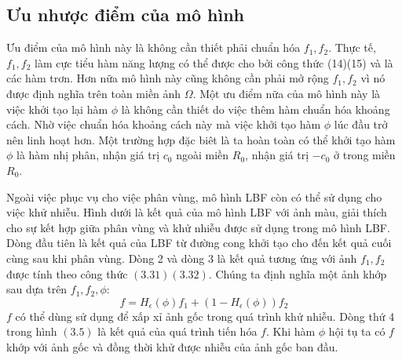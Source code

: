 \documentclass[12pt,oneside,a4]{report}
\begin{document}
\subsection{Ưu nhược điểm của mô hình}
Ưu điểm của mô hình này là không cần thiết phải chuẩn hóa $f_1, f_2$. Thực tế, $f_1, f_2$ làm cực tiểu hàm năng lượng có thể được cho bởi công thức (14)(15) và là các hàm trơn. Hơn nữa mô hình này cũng không cần phải mở rộng $f_1, f_2$ vì nó được định nghĩa trên toàn miền ảnh $\Omega$. Một ưu điểm nữa của mô hình này là việc khởi tạo lại hàm $\phi$ là không cần thiết do việc thêm hàm chuẩn hóa khoảng cách. Nhờ việc chuẩn hóa khoảng cách này mà việc khởi tạo hàm $\phi$ lúc đầu trở nên linh hoạt hơn. Một trường hợp đặc biêt là ta hoàn toàn có thể khởi tạo hàm $\phi$ là hàm nhị phân, nhận giá trị $c_0$ ngoài miền $R_0$, nhận giá trị $-c_0$ ở trong miền $R_0$.

Ngoài việc phục vụ cho việc phân vùng, mô hình LBF còn có thể sử dụng cho việc khử nhiễu. Hình dưới là kết quả của mô hình LBF với ảnh màu, giải thích cho sự kết hợp giữa phân vùng và khử nhiễu được sử dụng trong mô hình LBF. Dòng đầu tiên là kết quả của LBF từ đường cong khởi tạo cho đến kết quả cuối cùng sau khi phân vùng. Dòng 2 và dòng 3 là kết quả tương ứng với ảnh $f_1, f_2$ được tính theo công thức $(3.31)(3.32)$. Chúng ta định nghĩa một ảnh khớp sau dựa trên $f_1, f_2, \phi$:
\begin{equation}
f=H_{\epsilon}(\phi)f_1+(1-H_{\epsilon}(\phi))f_2
\end{equation}
$f$ có thể dùng sử dụng để xấp xỉ ảnh gốc trong quá trình khử nhiễu. Dòng thứ 4 trong hình $(3.5)$ là kết quả của quá trình tiến hóa $f$. Khi hàm $\phi$ hội tụ ta có $f$ khớp với ảnh gốc và đồng thời khử được nhiễu của ảnh gốc ban đầu. 
\end{document}
